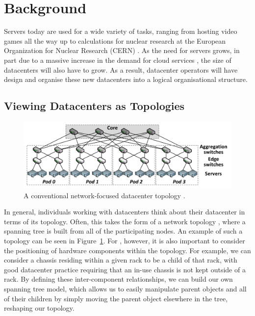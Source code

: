 \documentclass[11pt]{article}
\begin{document}
\section{Background} \label{sec:background}
	Servers today are used for a wide variety of tasks, ranging from hosting video games all the way up to calculations for nuclear research at the European Organization for Nuclear Research (CERN) \cite{Andrade2012}.
	As the need for servers grows, in part due to a massive increase in the demand for cloud services \cite{Pring2009}, the size of datacenters will also have to grow.
	As a result, datacenter operators will have design and organise these new datacenters into a logical organisational structure.
	\subsection{Viewing Datacenters as Topologies}
		\begin{figure}[]
			\centering
			\includegraphics[width=\textwidth]{couto2012/Fat-tree-with-4-port-switches-n-4.png}
			\caption[A conventional network-focused datacenter topology]{A conventional network-focused datacenter topology \cite{Couto2012}.}
			\label{fig:networktopology}
		\end{figure}
		In general, individuals working with datacenters think about their datacenter in terms of its topology. 
		Often, this takes the form of a network topology \cite{Couto2012}, where a spanning tree is built from all of the participating nodes.
		An example of such a topology can be seen in Figure~\ref{fig:networktopology}. 
		For \opendc{}, however, it is also important to consider the positioning of hardware components within the topology.
		For example, we can consider a chassis residing within a given rack to be a child of that rack, with good datacenter practice requiring that an in-use chassis is not kept outside of a rack.
		By defining these inter-component relationships, we can build our own spanning tree model, which allows us to easily manipulate parent objects and all of their children by simply moving the parent object elsewhere in the tree, reshaping our topology.
\end{document}
